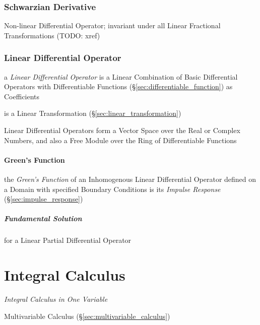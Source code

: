 \subsubsection{Schwarzian Derivative}\label{sec:schwarzian_derivative}

Non-linear Differential Operator; invariant under all Linear Fractional
Transformations (TODO: xref)



\subsubsection{Linear Differential Operator}
\label{sec:linear_differential_operator}

a \emph{Linear Differential Operator} is a Linear Combination of Basic
Differential Operators with Differentiable Functions
(\S\ref{sec:differentiable_function}) as Coefficients

is a Linear Transformation (\S\ref{sec:linear_transformation})

Linear Differential Operators form a Vector Space over the Real or Complex
Numbers, and also a Free Module over the Ring of Differentiable Functions



\paragraph{Green's Function}\label{sec:greens_function}\hfill

the \emph{Green's Function} of an Inhomogenous Linear Differential Operator
defined on a Domain with specified Boundary Conditions is its \emph{Impulse
  Response} (\S\ref{sec:impulse_response})



\subparagraph{Fundamental Solution}\label{sec:fundamental_solution}\hfill

for a Linear Partial Differential Operator



\section{Integral Calculus}\label{sec:integral_calculus}

\emph{Integral Calculus in One Variable}

\fist Multivariable Calculus (\S\ref{sec:multivariable_calculus})

